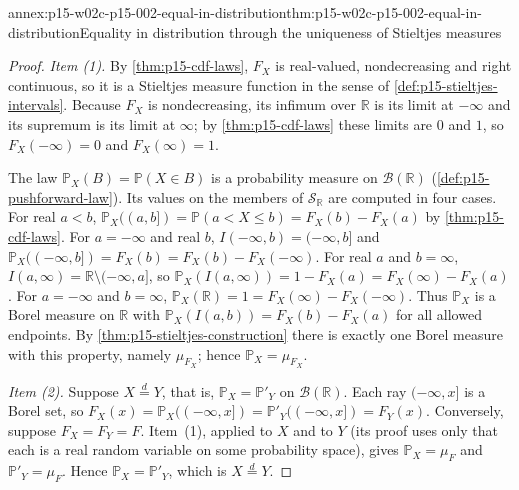 \begin{annexitem}{annex:p15-w02c-p15-002-equal-in-distribution}{thm:p15-w02c-p15-002-equal-in-distribution}{Equality in distribution through the uniqueness of Stieltjes measures}
\begin{proof}
\emph{Item (1).} By \cref{thm:p15-cdf-laws}, \(F_X\) is real-valued,
nondecreasing and right continuous, so it is a Stieltjes measure function
in the sense of \cref{def:p15-stieltjes-intervals}. Because \(F_X\) is
nondecreasing, its infimum over \(\mathbb R\) is its limit at
\(-\infty\) and its supremum is its limit at \(\infty\); by
\cref{thm:p15-cdf-laws} these limits are \(0\) and \(1\), so
\(F_X(-\infty)=0\) and \(F_X(\infty)=1\).

The law \(\mathbb P_X(B)=\mathbb P(X\in B)\) is a probability measure on
\(\mathcal B(\mathbb R)\) (\cref{def:p15-pushforward-law}). Its values on
the members of \(\mathcal S_{\mathbb R}\) are computed in four cases. For
real \(a<b\), \(\mathbb P_X((a,b])=\mathbb P(a<X\leq b)=F_X(b)-F_X(a)\) by
\cref{thm:p15-cdf-laws}. For \(a=-\infty\) and real \(b\),
\(I(-\infty,b)=(-\infty,b]\) and
\(\mathbb P_X((-\infty,b])=F_X(b)=F_X(b)-F_X(-\infty)\). For real \(a\)
and \(b=\infty\), \(I(a,\infty)=\mathbb R\setminus(-\infty,a]\), so
\(\mathbb P_X(I(a,\infty))=1-F_X(a)=F_X(\infty)-F_X(a)\). For
\(a=-\infty\) and \(b=\infty\),
\(\mathbb P_X(\mathbb R)=1=F_X(\infty)-F_X(-\infty)\). Thus
\(\mathbb P_X\) is a Borel measure on \(\mathbb R\) with
\(\mathbb P_X(I(a,b))=F_X(b)-F_X(a)\) for all allowed endpoints. By
\cref{thm:p15-stieltjes-construction} there is exactly one Borel measure
with this property, namely \(\mu_{F_X}\); hence \(\mathbb P_X=\mu_{F_X}\).

\emph{Item (2).} Suppose \(X\stackrel{d}{=}Y\), that is,
\(\mathbb P_X=\mathbb P'_Y\) on \(\mathcal B(\mathbb R)\). Each ray
\((-\infty,x]\) is a Borel set, so
\(F_X(x)=\mathbb P_X((-\infty,x])=\mathbb P'_Y((-\infty,x])=F_Y(x)\).
Conversely, suppose \(F_X=F_Y=F\). Item~(1), applied to \(X\) and to
\(Y\) (its proof uses only that each is a real random variable on some
probability space), gives \(\mathbb P_X=\mu_F\) and \(\mathbb P'_Y=\mu_F\).
Hence \(\mathbb P_X=\mathbb P'_Y\), which is \(X\stackrel{d}{=}Y\).
\end{proof}
\end{annexitem}

